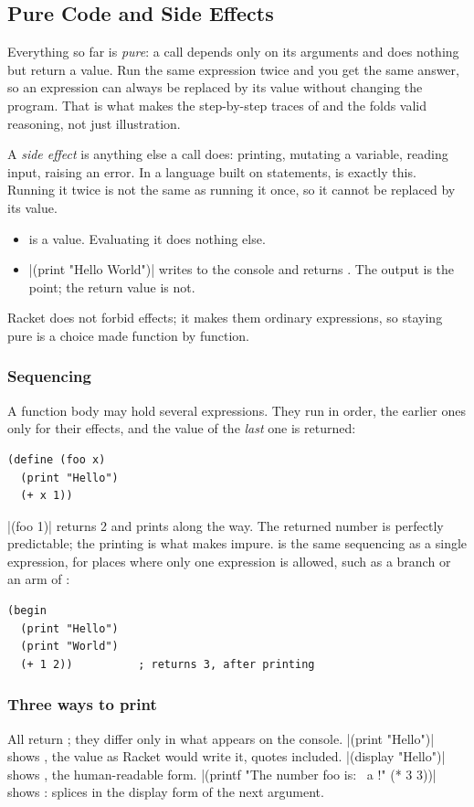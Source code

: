 \subsection{Pure Code and Side Effects}

Everything so far is \emph{pure}: a call depends only on its arguments and does nothing but return a value. Run the same expression twice and you get the same answer, so an expression can always be replaced by its value without changing the program. That is what makes the step-by-step traces of  and the folds valid reasoning, not just illustration.

A \emph{side effect} is anything else a call does: printing, mutating a variable, reading input, raising an error. In a language built on statements,  is exactly this. Running it twice is not the same as running it once, so it cannot be replaced by its value.
\begin{itemize}
  \item {} is a value. Evaluating it does nothing else.
  \item \rkt|(print "Hello World")| writes to the console and returns . The output is the point; the return value is not.
\end{itemize}
Racket does not forbid effects; it makes them ordinary expressions, so staying pure is a choice made function by function.

\subsubsection{Sequencing} A function body may hold several expressions. They run in order, the earlier ones only for their effects, and the value of the \emph{last} one is returned:
\begin{lstlisting}
(define (foo x)
  (print "Hello")
  (+ x 1))
\end{lstlisting}
\rkt|(foo 1)| returns 2 and prints along the way. The returned number is perfectly predictable; the printing is what makes  impure.  is the same sequencing as a single expression, for places where only one expression is allowed, such as a  branch or an arm of :
\begin{lstlisting}
(begin
  (print "Hello")
  (print "World")
  (+ 1 2))          ; returns 3, after printing
\end{lstlisting}

\subsubsection{Three ways to print} All return ; they differ only in what appears on the console. \rkt|(print "Hello")| shows , the value as Racket would write it, quotes included. \rkt|(display "Hello")| shows , the human-readable form. \rkt|(printf "The number foo is: ~a !" (* 3 3))| shows :  splices in the display form of the next argument.

